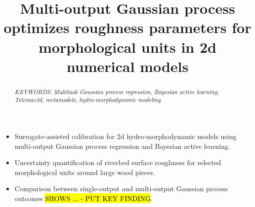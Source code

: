 \documentclass[draft,linenumbers,onecolumn]{agujournal2019} %
\begin{document}
\title{Multi-output Gaussian process optimizes roughness parameters for morphological units in 2d numerical models}

\graphicspath{ {./images/} }

%
%






\begin{itemize}
	\item Surrogate-assisted calibration for 2d hydro-morphodynamic models using multi-output Gaussian process regression and Bayesian active learning.
	\item Uncertainty quantification of riverbed surface roughness for selected morphological units around large wood pieces.
	\item Comparison between single-output and multi-output Gaussian process outcomes  \hl{SHOWS ... - PUT KEY FINDING}.
\end{itemize}

%
%



\begin{abstract}
	
	
\textit{KEYWORDS: Multitask Gaussian process regression, Bayesian active learning, Telemac2d, metamodels, hydro-morphodynamic modeling}
\end{abstract}
\end{document}
